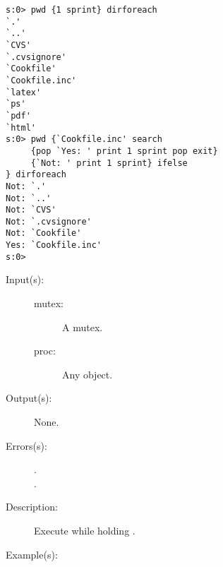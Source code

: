 \begin{description}
\begin{description}
\begin{verbatim}
s:0> pwd {1 sprint} dirforeach
`.'
`..'
`CVS'
`.cvsignore'
`Cookfile'
`Cookfile.inc'
`latex'
`ps'
`pdf'
`html'
s:0> pwd {`Cookfile.inc' search
     {pop `Yes: ' print 1 sprint pop exit}
     {`Not: ' print 1 sprint} ifelse
} dirforeach
Not: `.'
Not: `..'
Not: `CVS'
Not: `.cvsignore'
Not: `Cookfile'
Yes: `Cookfile.inc'
s:0>
		\end{verbatim}
	\end{description}
\label{systemdict:monitor}
\item[{\onyxop{mutex proc}{monitor}{--}}: ]
	\begin{description}\item[]
	\item[Input(s): ]
		\begin{description}\item[]
		\item[mutex: ]
			A mutex.
		\item[proc: ]
			Any object.
		\end{description}
	\item[Output(s): ] None.
	\item[Errors(s): ]
		\begin{description}\item[]
		\item[.]
		\item[.]
		\end{description}
	\item[Description: ]
		Execute  while holding .
	\item[Example(s): ]\begin{verbatim}


\end{verbatim}
\end{description}
\end{description}
